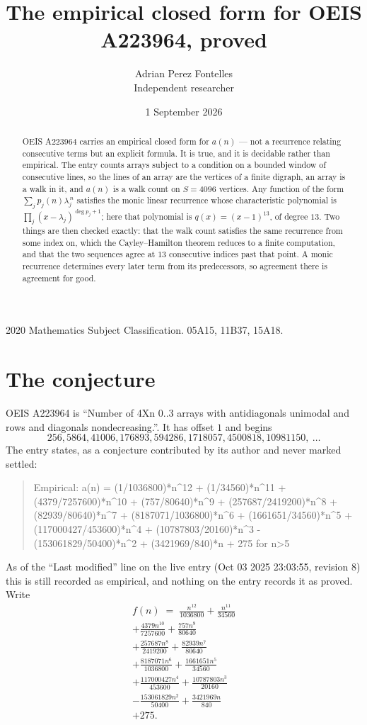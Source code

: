 \documentclass[11pt,a4paper]{article}
\title{The empirical closed form for OEIS A223964, proved}
\author{Adrian Perez Fontelles\\ \small Independent researcher}
\date{1 September 2026}
\theoremstyle{plain}
\theoremstyle{definition}
\begin{document}
\maketitle

\begin{abstract}
OEIS A223964 carries an empirical closed form for $a(n)$ --- not a recurrence relating
consecutive terms but an explicit formula. It is true, and it is decidable rather than
empirical. The entry counts arrays subject to a condition on a bounded window of consecutive lines, so the lines of an array are the
vertices of a finite digraph, an array is a walk in it, and $a(n)$ is a walk count on
$S=4096$ vertices. Any function of the form $\sum_j p_j(n)\lambda_j^{\,n}$ satisfies the
monic linear recurrence whose characteristic polynomial is
$\prod_j(x-\lambda_j)^{\deg p_j+1}$; here that polynomial is $q(x)=(x-1)^{13}$, of degree
$13$. Two things are then checked exactly: that the walk count satisfies the same
recurrence from some index on, which the Cayley--Hamilton theorem reduces to a finite
computation, and that the two sequences agree at $13$ consecutive indices past that
point. A monic recurrence determines every later term from its predecessors, so agreement
there is agreement for good.
\end{abstract}

\noindent\small 2020 Mathematics Subject Classification. 05A15, 11B37, 15A18.\normalsize

\section{The conjecture}

OEIS A223964 is ``Number of 4Xn 0..3 arrays with antidiagonals unimodal and rows and diagonals nondecreasing.''. It has offset $1$ and begins
\[
256, 5864, 41006, 176893, 594286, 1718057, 4500818, 10981150,\ \dots
\]
The entry states, as a conjecture contributed by its author and never marked settled:
\begin{quote}
Empirical: a(n) = (1/1036800)*n\^{}12 + (1/34560)*n\^{}11 + (4379/7257600)*n\^{}10 + (757/80640)*n\^{}9 + (257687/2419200)*n\^{}8 + (82939/80640)*n\^{}7 + (8187071/1036800)*n\^{}6 + (1661651/34560)*n\^{}5 + (117000427/453600)*n\^{}4 + (10787803/20160)*n\^{}3 - (153061829/50400)*n\^{}2 + (3421969/840)*n + 275 for n>5
\end{quote}
As of the ``Last modified'' line on the live entry (Oct 03 2025 23:03:55, revision 8) this is still
recorded as empirical, and nothing on the entry records it as proved. Write
\begin{multline*}
f(n)\;=\;\frac{n^{12}}{1036800} + \frac{n^{11}}{34560} \\
+ \frac{4379 n^{10}}{7257600} + \frac{757 n^{9}}{80640} \\
+ \frac{257687 n^{8}}{2419200} + \frac{82939 n^{7}}{80640} \\
+ \frac{8187071 n^{6}}{1036800} + \frac{1661651 n^{5}}{34560} \\
+ \frac{117000427 n^{4}}{453600} + \frac{10787803 n^{3}}{20160} \\
- \frac{153061829 n^{2}}{50400} + \frac{3421969 n}{840} \\
+ 275.
\end{multline*}
\end{document}
